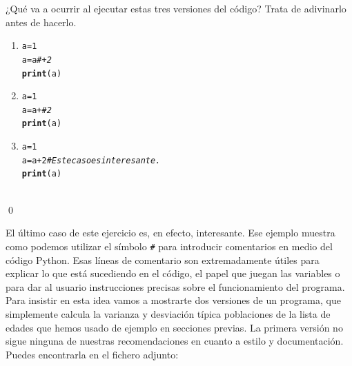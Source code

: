 \documentclass[10pt,a4paper]{article}\usepackage[]{graphicx}\usepackage[]{color}
\makeatletter
\newcommand{\hlcom}[1]{\textcolor[rgb]{0.678,0.584,0.686}{\textit{#1}}}%
\newcommand{\hlkwd}[1]{\textcolor[rgb]{0.737,0.353,0.396}{\textbf{#1}}}%
\newenvironment{kframe}{%
 \def\at@end@of@kframe{}%
 \ifinner\ifhmode%
  \def\at@end@of@kframe{\end{minipage}}%
  \begin{minipage}{\columnwidth}%
 \fi\fi%
 \def\FrameCommand##1{\hskip\@totalleftmargin \hskip-\fboxsep
 \colorbox{shadecolor}{##1}\hskip-\fboxsep
     \hskip-\linewidth \hskip-\@totalleftmargin \hskip\columnwidth}%
 \MakeFramed {\advance\hsize-\width
   \@totalleftmargin\z@ \linewidth\hsize
   \@setminipage}}%
 {\par\unskip\endMakeFramed%
 \at@end@of@kframe}
\newenvironment{knitrout}{}{} %
\newcounter {cont01}
\makeatother
\begin{document}
\begin{ejercicio}
\label{tut02:ejercicio18}
\quad
¿Qué va a ocurrir al ejecutar estas tres versiones del código? Trata de adivinarlo antes de hacerlo.
\begin{enumerate}
\item
\begin{knitrout}
\color{fgcolor}\begin{kframe}
\begin{alltt}
a = 1
a = a \hlcom{# + 2}
\hlkwd{print}(a)
\end{alltt}
\end{kframe}
\end{knitrout}
\item
\begin{knitrout}
\color{fgcolor}\begin{kframe}
\begin{alltt}
a = 1
a = a  + \hlcom{# 2}
\hlkwd{print}(a)
\end{alltt}
\end{kframe}
\end{knitrout}
\item
\begin{knitrout}
\color{fgcolor}\begin{kframe}
\begin{alltt}
a = 1
a = a  + 2 \hlcom{# Este caso es interesante.}
\hlkwd{print}(a)
\end{alltt}
\end{kframe}
\end{knitrout}
\end{enumerate}
\quad\\
\qed
\end{ejercicio}
El último caso de este ejercicio es, en efecto, interesante. Ese ejemplo muestra como podemos utilizar el símbolo \verb&#& para introducir comentarios en medio del código Python. Esas líneas de comentario son extremadamente útiles para explicar lo que está sucediendo en el código, el papel que juegan las variables o para dar al usuario instrucciones precisas sobre el funcionamiento del programa. Para insistir en esta idea vamos a mostrarte dos versiones de un programa, que simplemente calcula la varianza y desviación típica poblaciones de la lista de edades que hemos usado de ejemplo en secciones previas. La primera versión no sigue ninguna de nuestras recomendaciones en cuanto a estilo y documentación. Puedes encontrarla en el fichero adjunto:
\end{document}

